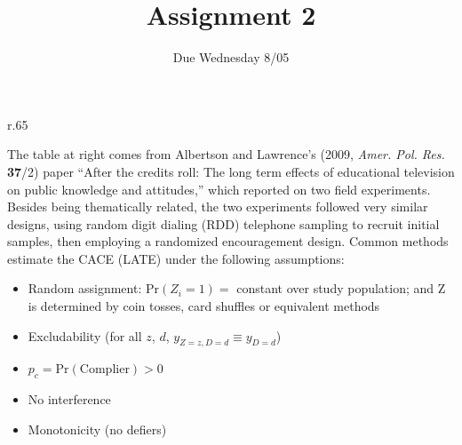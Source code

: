 \documentclass{article}
\title{Assignment 2}
\author{Due Wednesday 8/05}
\begin{document}
\maketitle

\begin{minipage}{1.0\linewidth}

\begin{wrapfigure}{r}{.65\linewidth}
\end{wrapfigure}

The table at right comes from Albertson and Lawrence's (2009, \textit{Amer. Pol. Res.} \textbf{37}/2) paper ``After the credits roll: The long term effects of educational television on public knowledge and attitudes,'' which reported on two field experiments. Besides being thematically related, the two experiments followed very similar designs, using random digit dialing (RDD) telephone sampling to recruit initial samples, then employing a randomized encouragement design.  Common methods estimate the CACE (LATE) under the following assumptions:

\begin{itemize}
\item Random assignment: $\mathrm{Pr}(Z_{i}=1) = $ constant over study population;  and $\mathrm{Z} $ is determined by coin tosses, card shuffles or equivalent methods
\item Excludability (for all $z$, $d$, $y_{Z=z, D=d} \equiv y_{D=d}$)
\item $p_{c} = \mathrm{Pr}(\mathrm{Complier}) > 0$ 
\item No interference 
\item Monotonicity (no defiers) 
\end{itemize}
  
\end{minipage}
\vspace{4ex}
\end{document}
